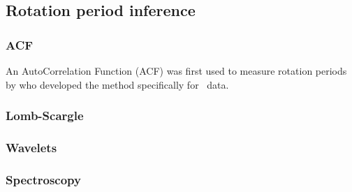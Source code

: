 \subsection{Rotation period inference}

\subsubsection{ACF}
An AutoCorrelation Function (ACF) was first used to measure rotation periods
by \citet{Mcquillan2013} who developed the method specifically for \kepler\
data.

\subsubsection{Lomb-Scargle}
\subsubsection{Wavelets}
\subsubsection{Spectroscopy}
